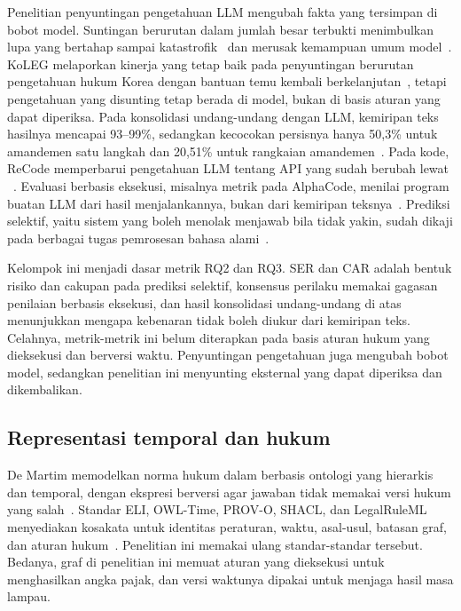 Penelitian penyuntingan pengetahuan LLM mengubah fakta yang tersimpan di bobot model. Suntingan berurutan dalam jumlah besar terbukti menimbulkan lupa yang bertahap sampai katastrofik~\cite{gupta2024forgetting} dan merusak kemampuan umum model~\cite{gu2024harms}. KoLEG melaporkan kinerja yang tetap baik pada penyuntingan berurutan pengetahuan hukum Korea dengan bantuan temu kembali berkelanjutan~\cite{seo2025koleg}, tetapi pengetahuan yang disunting tetap berada di model, bukan di basis aturan yang dapat diperiksa. Pada konsolidasi undang-undang dengan LLM, kemiripan teks hasilnya mencapai 93--99\%, sedangkan kecocokan persisnya hanya 50,3\% untuk amandemen satu langkah dan 20,51\% untuk rangkaian amandemen~\cite{prior2025risks}. Pada kode, ReCode memperbarui pengetahuan LLM tentang API yang sudah berubah lewat ~\cite{wu2026recode}. Evaluasi berbasis eksekusi, misalnya metrik  pada AlphaCode, menilai program buatan LLM dari hasil menjalankannya, bukan dari kemiripan teksnya~\cite{li2022alphacode}. Prediksi selektif, yaitu sistem yang boleh menolak menjawab bila tidak yakin, sudah dikaji pada berbagai tugas pemrosesan bahasa alami~\cite{varshney2022selective}.

Kelompok ini menjadi dasar metrik RQ2 dan RQ3. SER dan CAR adalah bentuk risiko dan cakupan pada prediksi selektif, konsensus perilaku memakai gagasan penilaian berbasis eksekusi, dan hasil konsolidasi undang-undang di atas menunjukkan mengapa kebenaran tidak boleh diukur dari kemiripan teks. Celahnya, metrik-metrik ini belum diterapkan pada basis aturan hukum yang dieksekusi dan berversi waktu. Penyuntingan pengetahuan juga mengubah bobot model, sedangkan penelitian ini menyunting  eksternal yang dapat diperiksa dan dikembalikan.

\subsection{Representasi temporal dan  hukum}
\label{subsec:kg-hukum}

De Martim memodelkan norma hukum dalam  berbasis ontologi yang hierarkis dan temporal, dengan ekspresi berversi agar jawaban tidak memakai versi hukum yang salah~\cite{demartim2025satgraph}. Standar ELI, OWL-Time, PROV-O, SHACL, dan LegalRuleML menyediakan kosakata untuk identitas peraturan, waktu, asal-usul, batasan graf, dan aturan hukum~\cite{publicationsoffice2026eli,cox2017owltime,lebo2013provo,knublauch2017shacl,palmirani2021legalruleml}. Penelitian ini memakai ulang standar-standar tersebut. Bedanya, graf di penelitian ini memuat aturan yang dieksekusi untuk menghasilkan angka pajak, dan versi waktunya dipakai untuk menjaga hasil masa lampau.

